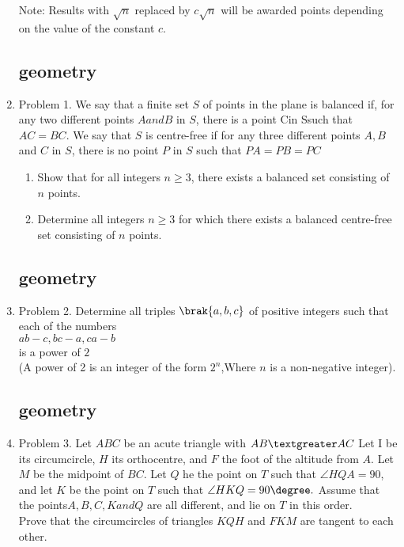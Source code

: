 \documentclass{article}
\begin{document}
\begin{enumerate}
Note: Results with $\sqrt n$ replaced by $c \sqrt n$  will be awarded points depending on the value of the constant $c$.

\newpage
		\subsection*{geometry}
\item Problem 1. We say that a finite set $S$ of points in the plane is balanced if, for any two different points $A and B$ in $S$, there is a point Cin Ssuch that $AC=BC$. We say that $S$ is centre-free if for any three different points $A, B$ and $C$ in $S$, there is no point $P$ in $S$ such that $PA=PB=PC$
	\begin{enumerate}

		\item  Show that for all integers $n\geq3$, there exists a balanced set consisting of $n$ points.

		\item  Determine all integers $n\geq3$ for which there exists a balanced centre-free set consisting of $n$ points.\\
	\end{enumerate}		
	\subsection*{geometry}
\item Problem 2. Determine all triples $\brak{a, b, c}$ of positive integers such that each of the numbers\\
			 $ ab-c, bc-a,ca-b$\\
		is a  power of $2$\\(A power of 2 is an integer of the form $2^n$,Where $n$ is a non-negative integer).
		\subsection*{geometry}
\item Problem 3. Let $ABC$ be an acute triangle with $AB\textgreater AC$ Let I be its circumcircle, $H$ its orthocentre, and $F$ the foot of the altitude from $A$. Let $M$ be the midpoint of $BC$. Let $Q$ he the point on $T$ such that $\angle HQA= 90$, and let $K$ be the point on $T$ such that $\angle HKQ=90\degree.$ Assume that the points$ A, B, C, K and Q$ are all different, and lie on $T$ in this order.\\

Prove that the circumcircles of triangles $KQH$ and $FKM$ are tangent to each other.

\end{enumerate}
\end{document}
